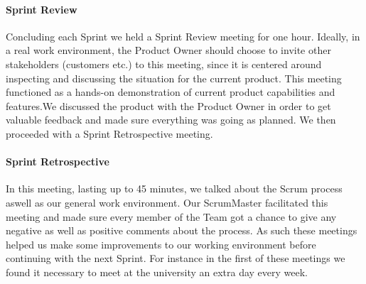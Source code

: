 \paragraph{Sprint Review}
Concluding each Sprint we held a Sprint Review meeting for one hour. Ideally, in a real work environment, the Product Owner should choose to invite other stakeholders (customers etc.) to this meeting, since it is centered around inspecting and discussing the situation for the current product. This meeting functioned as a hands-on demonstration of current product capabilities and features.We discussed the product with the Product Owner in order to get valuable feedback and made sure everything was going as planned. We then proceeded with a Sprint Retrospective meeting.

\paragraph{Sprint Retrospective}
In this meeting, lasting up to 45 minutes, we talked about the Scrum process aswell as our general work environment. Our ScrumMaster facilitated this meeting and made sure every member of the Team got a chance to give any negative as well as positive comments about the process. As such these meetings helped us make some improvements to our working environment before continuing with the next Sprint. For instance in the first of these meetings we found it necessary to meet at the university an extra day every week.
